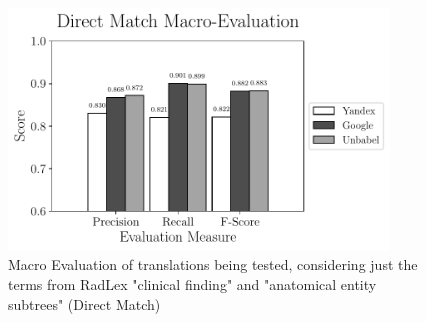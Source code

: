 \begin{figure}
	\centering
	\includegraphics[width=0.9\textwidth]{SupportFiles/plots/direct_match_macro_clinical_anatomical_subtrees_plot.pdf}
	\caption{Macro Evaluation of translations being tested, considering just the terms from RadLex "clinical finding" and "anatomical entity subtrees" (Direct Match)}
	\label{app:macro_eval_subtrees_direct}
\end{figure}

